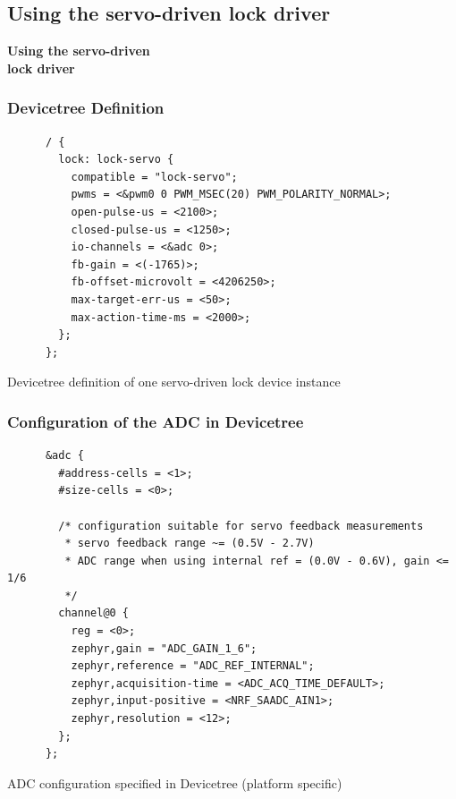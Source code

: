 \documentclass[handout]{beamer}
\begin{document}
\subsection{Using the servo-driven lock driver}

\begin{frame}
  \begin{center}
    \Large \textbf{Using the servo-driven\\lock driver}
  \end{center}
\end{frame}

\begin{frame}[fragile]
  \frametitle{Devicetree Definition}

  \begin{listing}[H]
    \begin{verbatim}
      / {
        lock: lock-servo {
          compatible = "lock-servo";
          pwms = <&pwm0 0 PWM_MSEC(20) PWM_POLARITY_NORMAL>;
          open-pulse-us = <2100>;
          closed-pulse-us = <1250>;
          io-channels = <&adc 0>;
          fb-gain = <(-1765)>;
          fb-offset-microvolt = <4206250>;
          max-target-err-us = <50>;
          max-action-time-ms = <2000>;
        };
      };
    \end{verbatim}
    \caption{Devicetree definition of one servo-driven lock device instance}
  \end{listing}
\end{frame}

\begin{frame}[fragile]
  \frametitle{Configuration of the ADC in Devicetree}

  \begin{listing}[H]
    \begin{verbatim}
      &adc {
        #address-cells = <1>;
        #size-cells = <0>;

        /* configuration suitable for servo feedback measurements
         * servo feedback range ~= (0.5V - 2.7V)
         * ADC range when using internal ref = (0.0V - 0.6V), gain <= 1/6
         */
        channel@0 {
          reg = <0>;
          zephyr,gain = "ADC_GAIN_1_6";
          zephyr,reference = "ADC_REF_INTERNAL";
          zephyr,acquisition-time = <ADC_ACQ_TIME_DEFAULT>;
          zephyr,input-positive = <NRF_SAADC_AIN1>;
          zephyr,resolution = <12>;
        };
      };
    \end{verbatim}
    \caption{ADC configuration specified in Devicetree (platform specific)}
  \end{listing}
\end{frame}
\end{document}
